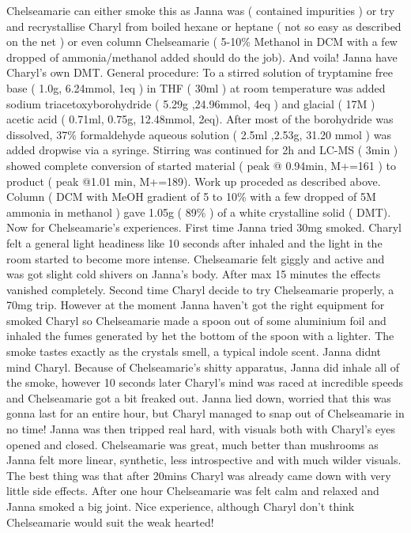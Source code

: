 \documentclass[12pt]{book}
\begin{document}
Chelseamarie can either smoke this as Janna was ( contained impurities ) or try and recrystallise Charyl from boiled hexane or heptane ( not so easy as described on the net ) or even column Chelseamarie ( 5-10\% Methanol in DCM with a few dropped of ammonia/methanol added should do the job). And voila! Janna have Charyl's own DMT. General procedure: To a stirred solution of tryptamine free base ( 1.0g, 6.24mmol, 1eq ) in THF ( 30ml ) at room temperature was added sodium triacetoxyborohydride ( 5.29g ,24.96mmol, 4eq ) and glacial ( 17M ) acetic acid ( 0.71ml, 0.75g, 12.48mmol, 2eq). After most of the borohydride was dissolved, 37\% formaldehyde aqueous solution ( 2.5ml ,2.53g, 31.20 mmol ) was added dropwise via a syringe. Stirring was continued for 2h and LC-MS ( 3min ) showed complete conversion of started material ( peak @ 0.94min, M+=161 ) to product ( peak @1.01 min, M+=189). Work up proceded as described above. Column ( DCM with MeOH gradient of 5 to 10\% with a few dropped of 5M ammonia in methanol ) gave 1.05g ( 89\% ) of a white crystalline solid ( DMT). Now for Chelseamarie's experiences. First time Janna tried 30mg smoked. Charyl felt a general light headiness like 10 seconds after inhaled and the light in the room started to become more intense. Chelseamarie felt giggly and active and was got slight cold shivers on Janna's body. After max 15 minutes the effects vanished completely. Second time Charyl decide to try Chelseamarie properly, a 70mg trip. However at the moment Janna haven't got the right equipment for smoked Charyl so Chelseamarie made a spoon out of some aluminium foil and inhaled the fumes generated by het the bottom of the spoon with a lighter. The smoke tastes exactly as the crystals smell, a typical indole scent. Janna didnt mind Charyl. Because of Chelseamarie's shitty apparatus, Janna did inhale all of the smoke, however 10 seconds later Charyl's mind was raced at incredible speeds and Chelseamarie got a bit freaked out. Janna lied down, worried that this was gonna last for an entire hour, but Charyl managed to snap out of Chelseamarie in no time! Janna was then tripped real hard, with visuals both with Charyl's eyes opened and closed. Chelseamarie was great, much better than mushrooms as Janna felt more linear, synthetic, less introspective and with much wilder visuals. The best thing was that after 20mins Charyl was already came down with very little side effects. After one hour Chelseamarie was felt calm and relaxed and Janna smoked a big joint. Nice experience, although Charyl don't think Chelseamarie would suit the weak hearted!
\end{document}
